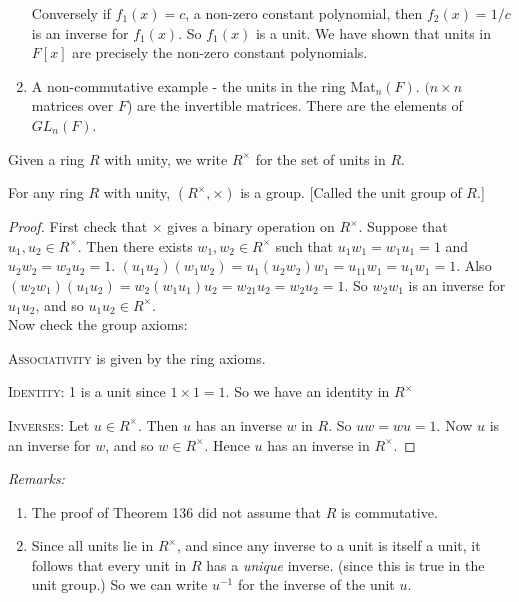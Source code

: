 \documentclass[10pt]{scrartcl}
\begin{document}
\begin{examples}
\begin{enumerate}
Conversely if $f_1(x) = c$, a non-zero constant polynomial, then $f_2(x) = 1/c$ is an inverse for $f_1(x)$. So $f_1(x)$ is a unit. We have shown that units in $F[x]$ are precisely the non-zero constant polynomials.

\item A non-commutative example - the units in the ring Mat$_n(F)$. $(n \times n$ matrices over $F$) are the invertible matrices. There are the elements of $GL_n(F)$. 

 \end{enumerate}\end{examples}\vspace*{5pt}
 
\begin{definition} Given a ring $R$ with unity, we write $R^{\times}$ for the set of units in $R$.	
\end{definition}\vspace*{10pt}
 
\begin{theorem} For any ring $R$ with unity, $(R^{\times},\times)$ is a group. [Called the unit group of $R$.]	
\end{theorem}

 \begin{proof}
First check that $\times$ gives a binary operation on $R^{\times}$. Suppose that $u_1,u_2 \in R^{\times}$. Then there exists $w_1,w_2 \in R^{\times}$ such that $u_1w_1 = w_1u_1 = 1$ and $u_2w_2 = w_2u_2 = 1$. $(u_1u_2)(w_1w_2) = u_1(u_2w_2)w_1 = u_11w_1 = u_1w_1 = 1$. Also $(w_2w_1)(u_1u_2) = w_2(w_1u_1)u_2 = w_21u_2 = w_2u_2 = 1$. So $w_2w_1$ is an inverse for $u_1u_2$, and so $u_1u_2 \in R^{\times}.$\\

Now check the group axioms:

\textsc{Associativity} is given by the ring axioms.

\textsc{Identity:} 1 is a unit since $1\times 1 = 1$. So we have an identity in $R^{\times}$

\textsc{Inverses:} Let $u \in R^{\times}$. Then $u$ has an inverse $w$ in $R$. So $uw = wu = 1$. Now $u$ is an inverse for $w$, and so $w \in R^{\times}$. Hence $u$ has an inverse in $R^{\times}$.
 \end{proof}
 
  \textit{Remarks:}\begin{enumerate}
\item  The proof of Theorem 136 did not assume that $R$ is commutative.
\item Since all units lie in $R^{\times}$, and since any inverse to a unit is itself a unit, it follows that every unit in $R$ has a \emph{unique} inverse. (since this is true in the unit group.) So we can write $u^{-1}$ for the inverse of the unit $u$.
 \end{enumerate}\vspace*{5pt}
 
\end{document}
